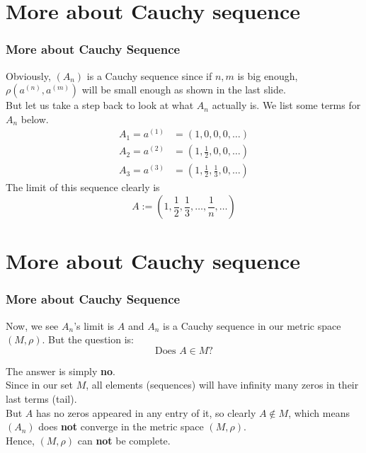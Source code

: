 \documentclass[12pt, t]{beamer}
\begin{document}
\section{More about Cauchy sequence}
\begin{frame}
    \frametitle{More about Cauchy Sequence}
    Obviously, $(A_n)$ is a Cauchy sequence since if $n,m$ is big enough, $\rho(a^{(n)},a^{(m)})$ will be small enough as shown in the last slide.\\
    \vspace{1em}
    But let us take a step back to look at what $A_n$ actually is. We list some terms for $A_n$ below.
    \begin{equation*}
        \begin{split}
            A_1=a^{(1)}&=(1,0,0,0,\dots)\\
            A_2=a^{(2)}&=(1,\frac{1}{2},0,0,\dots)\\
            A_3=a^{(3)}&=(1,\frac{1}{2},\frac{1}{3},0,\dots)
        \end{split}
    \end{equation*}
    The limit of this sequence clearly is
    \begin{equation*}
        A:=(1,\frac{1}{2},\frac{1}{3},\dots,\frac{1}{n},\dots)
    \end{equation*}


\end{frame}

\section{More about Cauchy sequence}
\begin{frame}
    \frametitle{More about Cauchy Sequence}
    Now, we see $A_n$'s limit is $A$ and $A_n$ is a Cauchy sequence in our metric space $(M,\rho)$. But the question is:
    \begin{equation*}
        \text{Does } A\in M \text{?}
    \end{equation*}

    The answer is simply \textbf{no}.\\
    \vspace{1em} Since in our set $M$, all elements (sequences) will have infinity many zeros in their last terms (tail).\\

    \vspace{1em} But $A$ has no zeros appeared in any entry of it, so clearly $A\notin M$, which means $(A_n)$ does \textbf{not} converge in the metric space
    $(M,\rho)$.\\

    \vspace{1em} Hence, $(M,\rho)$ can \textbf{not} be complete.
\end{frame}
\end{document}
